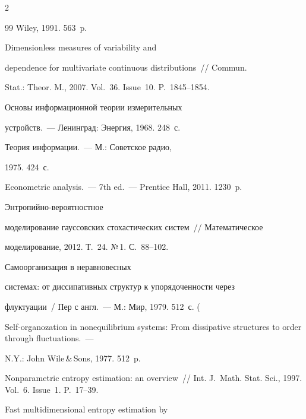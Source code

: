 \begin{multicols}{2}
{{\begin{thebibliography}{99}
Wiley, 1991. 563~p.


   Dimensionless measures of variability and 

dependence for multivariate continuous distributions~// Commun. 

Stat.: Theor. M., 2007. Vol.~36. Issue~10. P.~1845--1854.


   Основы информационной теории измерительных 

устройств.~--- Ленинград: Энергия, 1968. 248~с.


   Теория информации.~--- М.: Советское радио, 

1975. 424~с.


   Econometric analysis.~--- 7th ed.~--- Prentice Hall, 2011. 1230~p.


   Энтро\-пий\-но-ве\-ро\-ят\-но\-ст\-ное 

моделирование гауссовских стохастических сис\-тем~// Математическое 

моделирование, 2012. Т.~24. №\,1. С.~88--102.


   Самоорганизация в неравновесных 

  сис\-те\-мах: от диссипативных структур к упорядоченности через 

флуктуации~/ Пер с англ.~--- М.: Мир, 1979. 512~с. (

Self-organozation in nonequilibrium systems: From dissipative structures to order through fluctuations.~---

N.Y.: John Wile\,\&\,Sons, 1977. 512~p.



Nonparametric entropy estimation: an overview~// Int. J.~Math. Stat. Sci., 1997. Vol.~6. Issue~1. P.~17--39.


   Fast multidimensional entropy estimation by 


\end{thebibliography}}}
\end{multicols}
